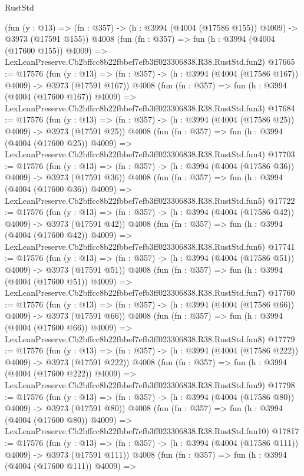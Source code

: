 \begin{lexlean}{RustStd}
\begin{coremodule}
    (fun (y : @13) => (fn : @357) -> (h : @3994 (@4004 (@17586 @155)) @4009) -> @3973 (@17591 @155))
    @4008
    (fun (fn : @357) =>
    fun (h : @3994 (@4004 (@17600 @155)) @4009) =>
    LexLeanPreserve.Cb2bffcc8b22fbbef7efb3ff023306838.R38.RustStd.fun2)
@17665 := @17576
    (fun (y : @13) => (fn : @357) -> (h : @3994 (@4004 (@17586 @167)) @4009) -> @3973 (@17591 @167))
    @4008
    (fun (fn : @357) =>
    fun (h : @3994 (@4004 (@17600 @167)) @4009) =>
    LexLeanPreserve.Cb2bffcc8b22fbbef7efb3ff023306838.R38.RustStd.fun3)
@17684 := @17576
    (fun (y : @13) => (fn : @357) -> (h : @3994 (@4004 (@17586 @25)) @4009) -> @3973 (@17591 @25))
    @4008
    (fun (fn : @357) =>
    fun (h : @3994 (@4004 (@17600 @25)) @4009) =>
    LexLeanPreserve.Cb2bffcc8b22fbbef7efb3ff023306838.R38.RustStd.fun4)
@17703 := @17576
    (fun (y : @13) => (fn : @357) -> (h : @3994 (@4004 (@17586 @36)) @4009) -> @3973 (@17591 @36))
    @4008
    (fun (fn : @357) =>
    fun (h : @3994 (@4004 (@17600 @36)) @4009) =>
    LexLeanPreserve.Cb2bffcc8b22fbbef7efb3ff023306838.R38.RustStd.fun5)
@17722 := @17576
    (fun (y : @13) => (fn : @357) -> (h : @3994 (@4004 (@17586 @42)) @4009) -> @3973 (@17591 @42))
    @4008
    (fun (fn : @357) =>
    fun (h : @3994 (@4004 (@17600 @42)) @4009) =>
    LexLeanPreserve.Cb2bffcc8b22fbbef7efb3ff023306838.R38.RustStd.fun6)
@17741 := @17576
    (fun (y : @13) => (fn : @357) -> (h : @3994 (@4004 (@17586 @51)) @4009) -> @3973 (@17591 @51))
    @4008
    (fun (fn : @357) =>
    fun (h : @3994 (@4004 (@17600 @51)) @4009) =>
    LexLeanPreserve.Cb2bffcc8b22fbbef7efb3ff023306838.R38.RustStd.fun7)
@17760 := @17576
    (fun (y : @13) => (fn : @357) -> (h : @3994 (@4004 (@17586 @66)) @4009) -> @3973 (@17591 @66))
    @4008
    (fun (fn : @357) =>
    fun (h : @3994 (@4004 (@17600 @66)) @4009) =>
    LexLeanPreserve.Cb2bffcc8b22fbbef7efb3ff023306838.R38.RustStd.fun8)
@17779 := @17576
    (fun (y : @13) => (fn : @357) -> (h : @3994 (@4004 (@17586 @222)) @4009) -> @3973 (@17591 @222))
    @4008
    (fun (fn : @357) =>
    fun (h : @3994 (@4004 (@17600 @222)) @4009) =>
    LexLeanPreserve.Cb2bffcc8b22fbbef7efb3ff023306838.R38.RustStd.fun9)
@17798 := @17576
    (fun (y : @13) => (fn : @357) -> (h : @3994 (@4004 (@17586 @80)) @4009) -> @3973 (@17591 @80))
    @4008
    (fun (fn : @357) =>
    fun (h : @3994 (@4004 (@17600 @80)) @4009) =>
    LexLeanPreserve.Cb2bffcc8b22fbbef7efb3ff023306838.R38.RustStd.fun10)
@17817 := @17576
    (fun (y : @13) => (fn : @357) -> (h : @3994 (@4004 (@17586 @111)) @4009) -> @3973 (@17591 @111))
    @4008
    (fun (fn : @357) =>
    fun (h : @3994 (@4004 (@17600 @111)) @4009) =>

\end{coremodule}
\end{lexlean}
